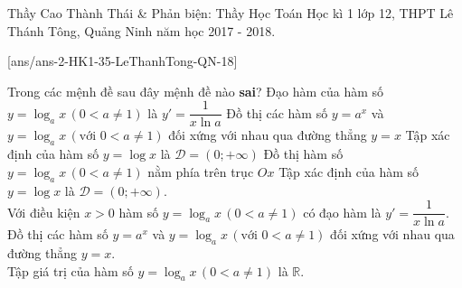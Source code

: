 

\begin{name}
{Thầy Cao Thành Thái \& Phản biện: Thầy Học Toán}
{Học kì 1 lớp 12, THPT Lê Thánh Tông, Quảng Ninh năm học 2017 - 2018.}
\end{name}
\setcounter{ex}{0}\setcounter{bt}{0}
[ans/ans-2-HK1-35-LeThanhTong-QN-18]


\begin{ex}%
 Trong các mệnh đề sau đây mệnh đề nào \textbf{sai}?
 \choice
  {Đạo hàm của hàm số $y = \log_a x \, (0< a \neq 1)$ là $y' = \dfrac{1}{x\ln a}$}
  {Đồ thị các hàm số $y = a^x$ và $y = \log_a x \, (\text{với } 0 < a \neq 1)$ đối xứng với nhau qua đường thẳng $y = x$}
  {Tập xác định của hàm số $y = \log x$ là $\mathscr{D} = (0; +\infty)$}
  {\True Đồ thị hàm số $y = \log_a x \,(0 < a \neq 1)$ nằm phía trên trục $Ox$}
 \loigiai
  {
  Tập xác định của hàm số $y = \log x$ là $\mathscr{D} = (0; +\infty)$.\\
  Với điều kiện $x > 0$ hàm số $y = \log_a x \, (0< a \neq 1)$ có đạo hàm là $y' = \dfrac{1}{x\ln a}$.\\
  Đồ thị các hàm số $y = a^x$ và $y = \log_a x \, (\text{với } 0 < a \neq 1)$ đối xứng với nhau qua đường thẳng $y = x$.\\
  Tập giá trị của hàm số $y = \log_a x \,(0 < a \neq 1)$ là $\mathbb{R}$.
  }
\end{ex}

